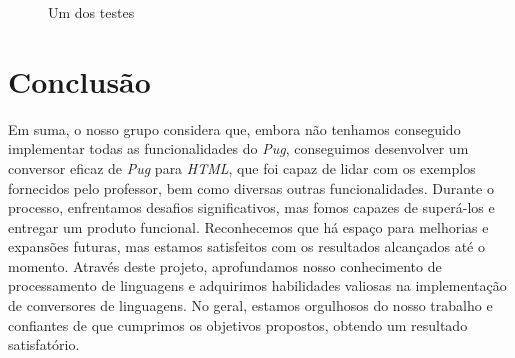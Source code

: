 \documentclass[11pt,a4paper]{report}%
\begin{document}
\begin{figure}[h]
{{  }
  }
  \caption{Um dos testes}
\end{figure}

\chapter{Conclusão} \label{concl}
Em suma, o nosso grupo considera que, embora não tenhamos conseguido implementar todas as funcionalidades do \textit{Pug}, conseguimos desenvolver um conversor eficaz de \textit{Pug} para \textit{HTML}, que foi capaz de lidar com os exemplos fornecidos pelo professor, bem como diversas outras funcionalidades. Durante o processo, enfrentamos desafios significativos, mas fomos capazes de superá-los e entregar um produto funcional. Reconhecemos que há espaço para melhorias e expansões futuras, mas estamos satisfeitos com os resultados alcançados até o momento. Através deste projeto, aprofundamos nosso conhecimento de processamento de linguagens e adquirimos habilidades valiosas na implementação de conversores de linguagens. No geral, estamos orgulhosos do nosso trabalho e confiantes de que cumprimos os objetivos propostos, obtendo um resultado satisfatório.

\newpage

\end{document}
